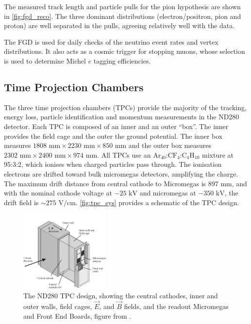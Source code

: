 The measured track length and particle pulls for the pion hypothesis are shown in \autoref{fig:fgd_reco}. The three dominant distributions (electron/positron, pion and proton) are well separated in the pulls, agreeing relatively well with the data.

The FGD is used for daily checks of the neutrino event rates and vertex distributions. It also acts as a cosmic trigger for stopping muons, whose selection is used to determine Michel $e$ tagging efficiencies.

\subsection{Time Projection Chambers}
The three time projection chambers (TPCs)\cite{t2k_tpc} provide the majority of the tracking, energy loss, particle identification and momentum measurements in the ND280 detector. Each TPC is composed of an inner and an outer ``box''. The inner provides the field cage and the outer the ground potential. The inner box measures $1808\text{ mm}\times2230\text{ mm}\times850\text{ mm}$ and the outer box measures $2302\text{ mm}\times2400\text{ mm}\times974\text{ mm}$.  All TPCs use an $\text{Ar}_{40}$:$\text{CF}_4$:$\text{C}_4\text{H}_{10}$ mixture at 95:3:2, which ionises when charged particles pass through. The ionisation electrons are drifted toward bulk micromegas detectors\cite{micromegas_1, micromegas_2}, amplifying the charge. The maximum drift distance from central cathode to Micromegas is 897 mm, and with the nominal cathode voltage at $-25\text{ kV}$ and micromegas at $-350\text{ kV}$, the drift field is $\sim 275\text{ V/cm}$. \autoref{fig:tpc_sys} provides a schematic of the TPC design.
\begin{figure}[h]
	\includegraphics[width=0.4\textwidth, trim={0mm 0mm 0mm 0mm}, clip,page=1]{figures/det_chap/tpc/tpc_1}
	\caption{The ND280 TPC design, showing the central cathodes, inner and outer walls, field cages, $\vec{E}$, and $\vec{B}$ fields, and the readout Micromegas and Front End Boards, figure from \cite{t2k_tpc}.}
	\label{fig:tpc_sys}
\end{figure}

